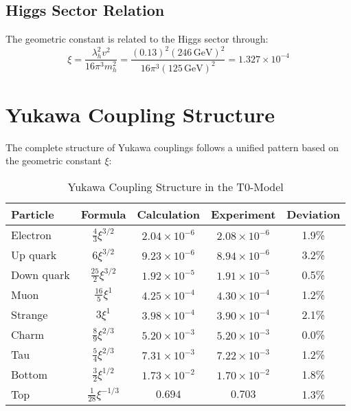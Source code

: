 \documentclass[12pt,a4paper]{article}
\newcommand{\xipar}{\xi}
\begin{document}
	\subsection{Higgs Sector Relation}
	
	The geometric constant is related to the Higgs sector through:
	\begin{equation}
		\xipar = \frac{\lambda_h^2 v^2}{16\pi^3 m_h^2} = \frac{(0.13)^2 (246\,\text{GeV})^2}{16\pi^3 (125\,\text{GeV})^2} = 1.327 \times 10^{-4}
	\end{equation}
	
	\section{Yukawa Coupling Structure}
	
	The complete structure of Yukawa couplings follows a unified pattern based on the geometric constant $\xipar$:
	
	\begin{table}[H]
		\centering
		\caption{Yukawa Coupling Structure in the T0-Model}
		\begin{tabular}{@{}lcccc@{}}
			\toprule
			\textbf{Particle} & \textbf{Formula} & \textbf{Calculation} & \textbf{Experiment} & \textbf{Deviation} \\
			\midrule
			Electron & $\frac{4}{3}\xipar^{3/2}$ & $2.04 \times 10^{-6}$ & $2.08 \times 10^{-6}$ & 1.9\% \\
			Up quark & $6\xipar^{3/2}$ & $9.23 \times 10^{-6}$ & $8.94 \times 10^{-6}$ & 3.2\% \\
			Down quark & $\frac{25}{2}\xipar^{3/2}$ & $1.92 \times 10^{-5}$ & $1.91 \times 10^{-5}$ & 0.5\% \\
			Muon & $\frac{16}{5}\xipar^1$ & $4.25 \times 10^{-4}$ & $4.30 \times 10^{-4}$ & 1.2\% \\
			Strange & $3\xipar^1$ & $3.98 \times 10^{-4}$ & $3.90 \times 10^{-4}$ & 2.1\% \\
			Charm & $\frac{8}{9}\xipar^{2/3}$ & $5.20 \times 10^{-3}$ & $5.20 \times 10^{-3}$ & 0.0\% \\
			Tau & $\frac{5}{4}\xipar^{2/3}$ & $7.31 \times 10^{-3}$ & $7.22 \times 10^{-3}$ & 1.2\% \\
			Bottom & $\frac{3}{2}\xipar^{1/2}$ & $1.73 \times 10^{-2}$ & $1.70 \times 10^{-2}$ & 1.8\% \\
			Top & $\frac{1}{28}\xipar^{-1/3}$ & $0.694$ & $0.703$ & 1.3\% \\
			\bottomrule
		\end{tabular}
	\end{table}
	
\end{document}
